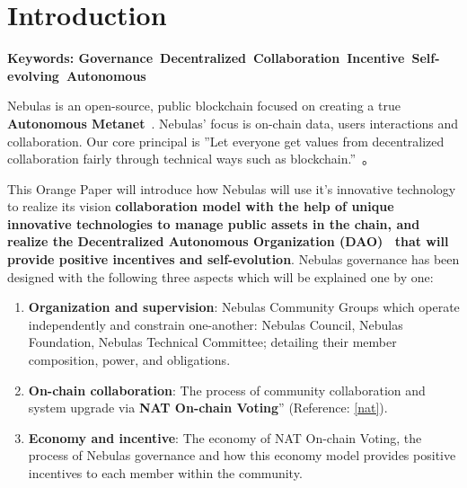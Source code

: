 
\section{Introduction}

\textbf{Keywords: Governance\ Decentralized\ Collaboration\ Incentive\ Self-evolving\ Autonomous }

\vspace{2em}

Nebulas is an open-source, public blockchain focused on creating a true \textbf{Autonomous Metanet}~\cite{AutonomousMetanet}. Nebulas' focus is on-chain data, users interactions and collaboration. Our core principal is ''Let everyone get values from decentralized collaboration fairly through technical ways such as blockchain.''~\cite{vision}。

This Orange Paper will introduce how Nebulas will use it's innovative technology to realize its vision \textbf{collaboration model with the help of unique innovative technologies to manage public assets in the chain, and realize the Decentralized Autonomous Organization (DAO)~\cite{DAO} that will provide positive incentives and self-evolution}. Nebulas governance has been designed with the following three aspects which will be explained one by one:

\begin{enumerate}
	\item \textbf{Organization and supervision}:
	Nebulas Community Groups which operate independently and constrain one-another: Nebulas Council, Nebulas Foundation, Nebulas Technical Committee; detailing their member composition, power, and obligations.
	\item \textbf{On-chain collaboration}:
	The process of community collaboration and system upgrade via \textbf{NAT On-chain Voting}” (Reference: \ref{nat}).
	\item \textbf{Economy and incentive}: 
	The economy of NAT On-chain Voting, the process of Nebulas governance and how this economy model provides positive incentives to each member within the community.
\end{enumerate}
